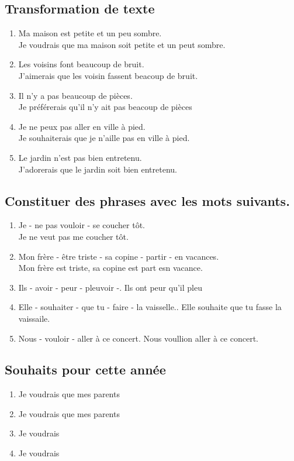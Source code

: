 \documentclass[12pt]{article}
\begin{document}
\subsection{Transformation de texte}
\begin{enumerate}
	\item Ma maison est petite et un peu sombre.\\
	 Je voudrais que ma maison soit petite et un peut sombre.
	\item Les voisins font beaucoup de bruit.\\
	 J’aimerais que les voisin fassent beacoup de bruit.
	\item Il n’y a pas beaucoup de pièces.\\
	Je préférerais qu'il n'y ait pas beacoup de pièces
	\item Je ne peux pas aller en ville à pied.\\
	Je souhaiterais que je n'aille pas en ville à pied.
	\item Le jardin n’est pas bien entretenu.\\
	J’adorerais que le jardin soit bien entretenu.
\end{enumerate}


\subsection{Constituer des phrases avec les mots suivants.}
\begin{enumerate}
	\item Je - ne pas vouloir - se coucher tôt.\\
	Je ne veut pas me coucher tôt.
	\item Mon frère - être triste - sa copine - partir - en vacances.\\
	Mon frère est triste, sa copine est part esn vacance.
	\item Ils - avoir - peur - pleuvoir -.
	Ils ont peur qu'il pleu
	\item Elle - souhaiter - que tu - faire - la vaisselle..
	Elle souhaite que tu fasse la vaissaile.
	\item Nous - vouloir - aller à ce concert.
	Nous voullion aller à ce concert.
\end{enumerate}
\subsection{Souhaits pour cette année}
\begin{enumerate}
	\item Je voudrais que mes parents

	\item Je voudrais que mes parents

	\item Je voudrais

	\item Je voudrais

\end{enumerate}
\end{document}
